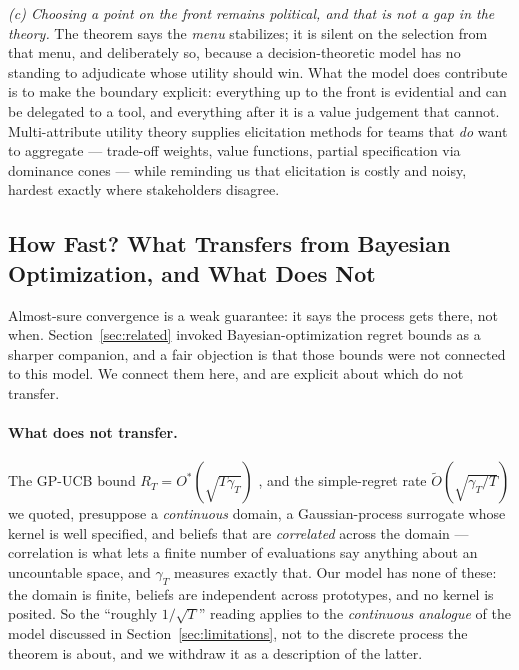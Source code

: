 \documentclass[11pt]{article}
\begin{document}
\emph{(c) Choosing a point on the front remains political, and that is not a gap in the theory.} The theorem says the \emph{menu} stabilizes; it is silent on the selection from that menu, and deliberately so, because a decision-theoretic model has no standing to adjudicate whose utility should win. What the model does contribute is to make the boundary explicit: everything up to the front is evidential and can be delegated to a tool, and everything after it is a value judgement that cannot. Multi-attribute utility theory \citep{keeney1976} supplies elicitation methods for teams that \emph{do} want to aggregate --- trade-off weights, value functions, partial specification via dominance cones --- while reminding us that elicitation is costly and noisy, hardest exactly where stakeholders disagree.

\subsection{How Fast? What Transfers from Bayesian Optimization, and What Does Not}
\label{sec:rates}

Almost-sure convergence is a weak guarantee: it says the process gets there, not when. Section~\ref{sec:related} invoked Bayesian-optimization regret bounds as a sharper companion, and a fair objection is that those bounds were not connected to this model. We connect them here, and are explicit about which do not transfer.

\paragraph{What does not transfer.} The GP-UCB bound $R_T=O^{*}(\sqrt{T\gamma_T})$ \citep{srinivas2012}, and the simple-regret rate $\widetilde O(\sqrt{\gamma_T/T})$ we quoted, presuppose a \emph{continuous} domain, a Gaussian-process surrogate whose kernel is well specified, and beliefs that are \emph{correlated} across the domain --- correlation is what lets a finite number of evaluations say anything about an uncountable space, and $\gamma_T$ measures exactly that. Our model has none of these: the domain is finite, beliefs are independent across prototypes, and no kernel is posited. So the ``roughly $1/\sqrt{T}$'' reading applies to the \emph{continuous analogue} of the model discussed in Section~\ref{sec:limitations}, not to the discrete process the theorem is about, and we withdraw it as a description of the latter.
\end{document}
